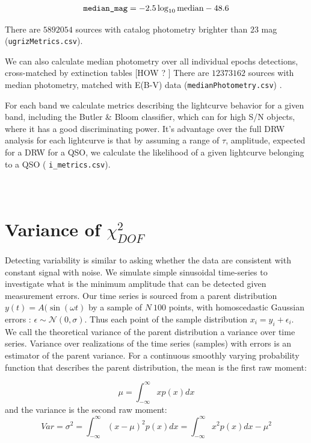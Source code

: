 \documentclass[fleqn,usenatbib]{mnras}  %
\begin{document}
\begin{equation}
\verb|median_mag| = -2.5 \log_{10}\mbox{median} - 48.6
\end{equation}

There are  $5892054$ sources with catalog photometry brighter than $23$ mag  (\verb|ugrizMetrics.csv|). 

We can also calculate median photometry over all individual epochs  detections, cross-matched by extinction tables [HOW ? ]  There are $12373162$ sources with median photometry, matched with E(B-V) data (\verb|medianPhotometry.csv|) . 

For each band we calculate metrics describing the lightcurve behavior for a given band, including the Butler \& Bloom classifier, which can  for high S/N objects, where it has a good discriminating power. It's advantage over the full DRW analysis for each lightcurve is that by assuming a range of $\tau$, amplitude, expected for a DRW for a QSO, we calculate the likelihood of a given lightcurve belonging to a QSO ( \verb|i_metrics.csv|). 

\section{\\ Variance of $\chi^{2}_{DOF}$ }
\label{App:AppendixD}

Detecting variability is similar to asking whether the data are consistent with constant signal with noise. We simulate simple sinusoidal time-series to investigate what is the minimum amplitude that can be detected given measurement errors. Our time series is sourced from a parent distribution $y(t) = A(\sin(\omega t)$ by a sample of $N~100$ points, with homoscedastic Gaussian errors :  $\epsilon \sim \mathcal{N}(0,\sigma)$.  Thus each point of the sample distribution $x_{i} = y_{i} + \epsilon_{i}$. We call the theoretical variance of the parent distribution a variance over time series. Variance over realizations of the time series (samples) with errors is an estimator of the parent variance.  For a continuous smoothly varying probability function that describes the parent distribution, the mean is the first raw moment:

\begin{equation}
\mu = \int_{-\infty}^{\infty}{x p(x) dx}
\end{equation} 
and the variance is the second raw moment:
\begin{equation}
Var = \sigma^{2} =  \int_{-\infty}^{\infty}{(x-\mu)^{2} p(x) dx} =  \int_{-\infty}^{\infty}{x^{2} p(x) dx} - \mu^{2}
\end{equation}
\end{document}
